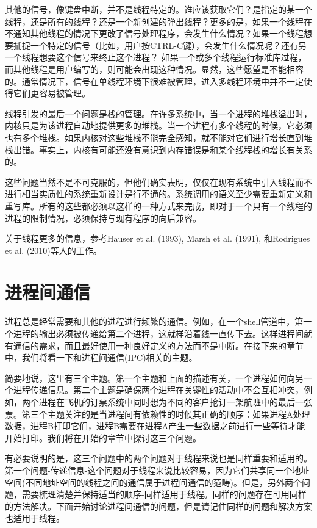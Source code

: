 	其他的信号，像键盘中断，并不是线程特定的。谁应该获取它们？是指定的某一个线程，还是所有的线程？还是一个新创建的弹出线程？更多的是，如果一个线程在不通知其他线程的情况下更改了信号处理程序，会发生什么情况？如果一个线程想要捕捉一个特定的信号（比如，用户按CTRL-C键），会发生什么情况呢？还有另一个线程想要这个信号来终止这个进程？ 如果一个或多个线程运行标准库过程，而其他线程是用户编写的，则可能会出现这种情况。显然，这些愿望是不能相容的。通常情况下，信号在单线程环境下很难被管理，进入多线程环境中并不一定使得它们更容易被管理。
	
	线程引发的最后一个问题是栈的管理。在许多系统中，当一个进程的堆栈溢出时，内核只是为该进程自动地提供更多的堆栈。当一个进程有多个线程的时候，它必须也有多个堆栈。如果内核对这些堆栈不能完全感知，就不能对它们进行增长直到堆栈出错。事实上，内核有可能还没有意识到内存错误是和某个线程栈的增长有关系的。
	
	这些问题当然不是不可克服的，但他们确实表明，仅仅在现有系统中引入线程而不进行相当实质性的系统重新设计是行不通的。系统调用的语义至少需要重新定义和重写库。所有的这些都必须以这样的一种方式来完成，即对于一个只有一个线程的进程的限制情况，必须保持与现有程序的向后兼容。
	
	关于线程更多的信息，参考Hauser et al. (1993), Marsh et al. (1991), 和Rodrigues et al.
(2010)等人的工作。
	
	\section{进程间通信}
	
	进程总是经常需要和其他的进程进行频繁的通信。例如，在一个shell管道中，第一个进程的输出必须被传递给第二个进程，这就样沿着线一直传下去。这样进程间就有通信的需求，而且最好使用一种良好定义的方法而不是中断。在接下来的章节中，我们将看一下和进程间通信(IPC)相关的主题。
	
	简要地说，这里有三个主题。第一个主题和上面的描述有关，一个进程如何向另一个进程传递信息。第二个主题是确保两个进程在关键性的活动中不会互相冲突，例如，两个进程在飞机的订票系统中同时想为不同的客户抢订一架航班中的最后一张票。第三个主题关注的是当进程间有依赖性的时候其正确的顺序：如果进程A处理数据，进程B打印它们，进程B需要在进程A产生一些数据之前进行一些等待才能开始打印。我们将在开始的章节中探讨这三个问题。
	
	有必要说明的是，这三个问题中的两个问题对于线程来说也是同样重要和适用的。第一个问题-传递信息-这个问题对于线程来说比较容易，因为它们共享同一个地址空间(不同地址空间的线程之间的通信属于进程间通信的范畴)。但是，另外两个问题，需要梳理清楚并保持适当的顺序-同样适用于线程。同样的问题存在可用同样的方法解决。下面开始讨论进程间通信的问题，但是请记住同样的问题和解决方案也适用于线程。
	
